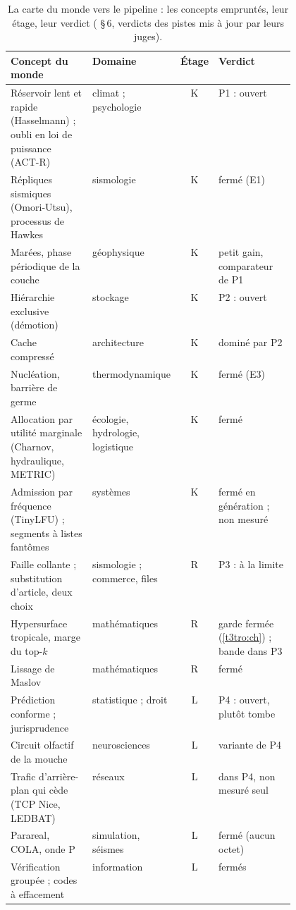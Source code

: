 \begin{table}[tbp]
\centering\footnotesize
\caption[La carte du monde vers le pipeline]{La carte du monde vers le pipeline : les concepts empruntés, leur étage, leur verdict ( §\,6, verdicts des pistes mis à jour par leurs juges).}
\label{t3mim:tab:carte}
\renewcommand{\arraystretch}{1.08}
\begin{tabularx}{\linewidth}{@{}>{\raggedright\arraybackslash}X>{\raggedright\arraybackslash}p{0.2\linewidth}c>{\raggedright\arraybackslash}p{0.27\linewidth}@{}}
\toprule
Concept du monde & Domaine & Étage & Verdict \\
\midrule
Réservoir lent et rapide (Hasselmann) ; oubli en loi de puissance (ACT-R) & climat ; psychologie & K & P1 : ouvert \\
Répliques sismiques (Omori-Utsu), processus de Hawkes & sismologie & K & fermé (E1) \\
Marées, phase périodique de la couche & géophysique & K & petit gain, comparateur de P1 \\
Hiérarchie exclusive (démotion) & stockage & K & P2 : ouvert \\
Cache compressé & architecture & K & dominé par P2 \\
Nucléation, barrière de germe & thermodynamique & K & fermé (E3) \\
Allocation par utilité marginale (Charnov, hydraulique, METRIC) & écologie, hydrologie, logistique & K & fermé \\
Admission par fréquence (TinyLFU) ; segments à listes fantômes & systèmes & K & fermé en génération ; non mesuré \\
Faille collante ; substitution d'article, deux choix & sismologie ; commerce, files & R & P3 : à la limite \\
Hypersurface tropicale, marge du top-$k$ & mathématiques & R & garde fermée (\cref{t3tro:ch}) ; bande dans P3 \\
Lissage de Maslov & mathématiques & R & fermé \\
Prédiction conforme ; jurisprudence & statistique ; droit & L & P4 : ouvert, plutôt tombe \\
Circuit olfactif de la mouche & neurosciences & L & variante de P4 \\
Trafic d'arrière-plan qui cède (TCP Nice, LEDBAT) & réseaux & L & dans P4, non mesuré seul \\
Parareal, COLA, onde P & simulation, séismes & L & fermé (aucun octet) \\
Vérification groupée ; codes à effacement & information & L & fermés \\

\end{tabularx}
\end{table}
